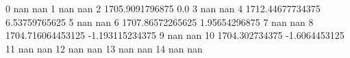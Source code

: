 0 nan nan
1 nan nan
2 1705.9091796875 0.0
3 nan nan
4 1712.44677734375 6.53759765625
5 nan nan
6 1707.86572265625 1.95654296875
7 nan nan
8 1704.716064453125 -1.193115234375
9 nan nan
10 1704.302734375 -1.6064453125
11 nan nan
12 nan nan
13 nan nan
14 nan nan
